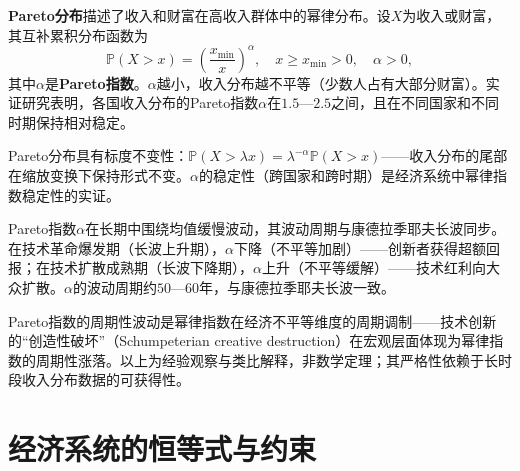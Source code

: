 \begin{definition}[Pareto分布]\label{def:pareto_distribution}
\textbf{Pareto分布}描述了收入和财富在高收入群体中的幂律分布。设$X$为收入或财富，其互补累积分布函数为
\[
\mathbb{P}(X > x) = \left(\frac{x_{\min}}{x}\right)^\alpha, \quad x \ge x_{\min} > 0, \quad \alpha > 0,
\]
其中$\alpha$是\textbf{Pareto指数}。$\alpha$越小，收入分布越不平等（少数人占有大部分财富）。实证研究表明，各国收入分布的Pareto指数$\alpha$在$1.5$—$2.5$之间，且在不同国家和不同时期保持相对稳定。

Pareto分布具有标度不变性：$\mathbb{P}(X > \lambda x) = \lambda^{-\alpha} \mathbb{P}(X > x)$——收入分布的尾部在缩放变换下保持形式不变。$\alpha$的稳定性（跨国家和跨时期）是经济系统中幂律指数稳定性的实证。
\end{definition}

\begin{remark}\label{prop:pareto_growth}
Pareto指数$\alpha$在长期中围绕均值缓慢波动，其波动周期与康德拉季耶夫长波同步。在技术革命爆发期（长波上升期），$\alpha$下降（不平等加剧）——创新者获得超额回报；在技术扩散成熟期（长波下降期），$\alpha$上升（不平等缓解）——技术红利向大众扩散。$\alpha$的波动周期约$50$—$60$年，与康德拉季耶夫长波一致。

Pareto指数的周期性波动是幂律指数在经济不平等维度的周期调制——技术创新的“创造性破坏”（Schumpeterian creative destruction）在宏观层面体现为幂律指数的周期性涨落。以上为经验观察与类比解释，非数学定理；其严格性依赖于长时段收入分布数据的可获得性。
\end{remark}

\section{经济系统的恒等式与约束}

